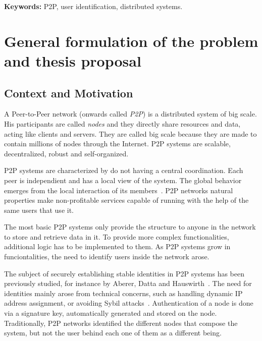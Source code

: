 \documentclass[12pt,spanish]{article}
\begin{document}
{\begin{minipage}[b]{0.9\textwidth}
{\bf Keywords:} P2P, user identification, distributed systems.

\end{minipage}
}

\vfill
\section{General formulation of the problem and thesis proposal}



\subsection{Context and Motivation}

A Peer-to-Peer network (onwards called \textit{P2P}) is a distributed system of big scale. His participants
are called \textit{nodes} and they directly share resources and data, acting
like clients and servers. They are called big scale because they are made to
contain millions of nodes through the Internet. P2P systems are scalable,
decentralized, robust and self-organized.

P2P systems are characterized by do not having a central coordination. Each
peer is independient and has a local view of the system. The global behavior
emerges from the local interaction of its members~\cite{Aberer:2001:PIS:503271.503268}.
P2P networks natural properties make non-profitable services capable of running
with the help of the same users that use it. 

The most basic P2P systems only provide the structure to anyone in the network
to store and retrieve data in it. To provide more complex functionalities,
additional logic has to be implemented to them.
As P2P systems grow in funciontalities, the need to identify users inside the
network arose.

The subject of securely establishing stable identities in P2P
systems has been previously studied, for instance by Aberer,
Datta and Hauswirth~\cite{1318567}. The need for identities mainly arose
from technical concerns, such as handling dynamic IP address
assignment, or avoiding Sybil attacks~\cite{the_sybil_attack}. Authentication of a
node is done via a signature key, automatically generated and
stored on the node. Traditionally, P2P networks identified the different nodes that compose the
system, but not the user behind each one of them as a different being.
\end{document}
